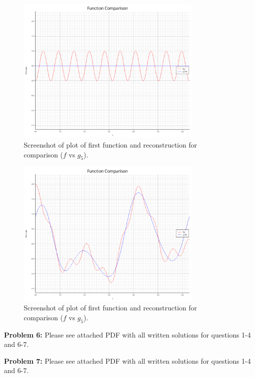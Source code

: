 \documentclass[12pt, letterpaper]{article}
\theoremstyle{nonumberplain}
\begin{document}
\begin{figure}[!htbp]
	\centering
	\includegraphics[width=0.8\textwidth]{first-func-plot.png}
	\caption{Screenshot of plot of first function and reconstruction for comparison ($f$ vs $g_5$).}
\end{figure}

\begin{figure}[!htbp]
	\centering
	\includegraphics[width=0.8\textwidth]{second-func-plot.png}
	\caption{Screenshot of plot of first function and reconstruction for comparison ($f$ vs $g_5$).}
\end{figure}


\clearpage

\hspace{18pt}\textbf{Problem 6:} \medskip
Please see attached PDF with all written solutions for questions 1-4 and 6-7.

\hspace{18pt}\textbf{Problem 7:} \medskip
Please see attached PDF with all written solutions for questions 1-4 and 6-7.
\end{document}
